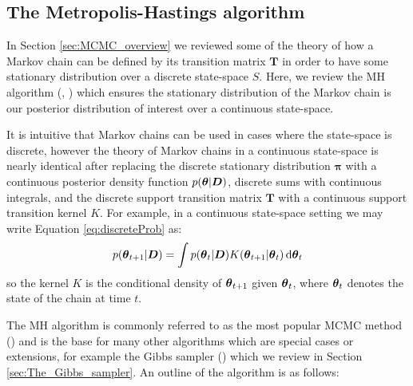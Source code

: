 \subsection{The Metropolis-Hastings algorithm}
\label{sec:The_Metropolis-Hastings_algorithm}

In Section \ref{sec:MCMC_overview} we reviewed some of the theory of how a Markov chain can be defined by its
transition matrix \(\boldsymbol{T}\) in order to have some stationary distribution over a discrete state-space \(S\).
Here, we review the \gls{MH} algorithm (\cite{Metropolis1953}, \cite{Hastings1970}) which ensures the stationary
distribution of the Markov chain is our posterior distribution of interest over a continuous state-space.

It is intuitive that Markov chains can be used in cases where the state-space is discrete, however the theory of Markov
chains in a continuous state-space is nearly identical after replacing the discrete stationary distribution
\(\boldsymbol{\pi}\) with a continuous posterior density function \(p(\boldsymbol{\theta} | \boldsymbol{D})\), discrete sums with
continuous integrals, and the discrete support transition matrix \(\boldsymbol{T}\) with a continuous support transition
kernel \(K\). For example, in a continuous state-space setting we may write Equation \eqref{eq:discreteProb} as:
\begin{align} 
p(\boldsymbol{\theta}_{t+1} | \boldsymbol{D}) = \int p(\boldsymbol{\theta}_t | \boldsymbol{D}) K(\boldsymbol{\theta}_{t+1} | \boldsymbol{\theta}_t) \, \mathrm{d}\boldsymbol{\theta}_t
\end{align}
so the kernel \(K\) is the conditional density of \(\boldsymbol{\theta}_{t+1}\) given \(\boldsymbol{\theta}_t\), where \(\boldsymbol{\theta}_t\)
denotes the state of the chain at time \(t\).

The \gls{MH} algorithm is commonly referred to as the most popular \gls{MCMC} method (\cite{hitchcock2003}) and is the
base for many other algorithms which are special cases or extensions, for example the Gibbs sampler (\cite{geman1984})
which we review in Section \ref{sec:The_Gibbs_sampler}. An outline of the algorithm is as follows:

